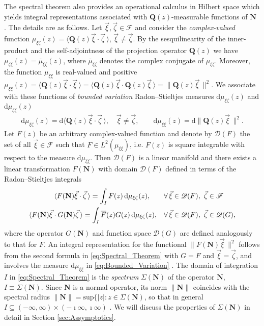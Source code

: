 \documentclass[11pt]{amsart}
\renewcommand{\d}{\mathrm{d}}
\newcommand{\Qb}{\mathbf{Q}}
\newcommand{\Nb}{\mathbf{N}}
\newcommand{\Fs}{\mathscr{F}}
\begin{document}
The spectral theorem also provides an operational calculus in Hilbert
space which yields integral representations associated with
$\Qb(z)$-measurable functions of $\Nb$ \cite{Stone:64}. The details
are as follows. Let $\vec{\xi},\vec{\zeta}\in\Fs$ and consider the
\emph{complex-valued} function $\mu_{\xi\zeta}(z)=\langle\Qb(z)\vec{\xi}\cdot\vec{\zeta}\,\rangle$,
$\vec{\xi}\neq\vec{\zeta}$. By the sesquilinearity of the inner-product and the
self-adjointness of the projection operator $\Qb(z)$ we have
$\mu_{\zeta\xi}(z)=\overline{\mu}_{\xi\zeta}(z)$, where $\overline{\mu}_{\xi\zeta}$ denotes
the complex conjugate of $\mu_{\xi\zeta}$. Moreover, the function $\mu_{\xi\xi}$ is
real-valued and positive
$\mu_{\xi\xi}(z)=\langle\Qb(z)\vec{\xi}\cdot\vec{\xi}\,\rangle=\langle\Qb(z)\vec{\xi}\cdot\Qb(z)\vec{\xi}\,\rangle
=\|\Qb(z)\vec{\xi}\,\|^2$. We associate with these functions of
\emph{bounded variation} Radon--Stieltjes measures $\d\mu_{\xi\zeta}(z)$ and
$\d\mu_{\xi\xi}(z)$ \cite{Stone:64}   
%
\begin{align}\label{eq:Bounded_Variation}
  \d\mu_{\xi\zeta}(z)=\d\langle\Qb(z)\vec{\xi}\cdot\vec{\zeta}\,\rangle, \quad
  \vec{\xi}\neq\vec{\zeta}, \qquad
  \d\mu_{\xi\xi}(z)=\d\|\Qb(z)\vec{\xi}\,\|^2.
\end{align}
%
Let $F(z)$ be an arbitrary complex-valued function and denote by
$\mathscr{D}(F)$ the set of all $\vec{\xi}\in\Fs$ such that
$F\in L^2(\mu_{\xi\xi})$, i.e. $F(z)$ is square integrable with respect to the
measure $\d\mu_{\xi\xi}$. 
Then $\mathscr{D}(F)$ is a linear manifold and there exists a linear
transformation $F(\Nb)$ with domain $\mathscr{D}(F)$ defined in terms
of the Radon--Stieltjes integrals \cite{Stone:64} 
%
\begin{align}\label{eq:Spectral_Theorem}
  \langle F(\Nb)\vec{\xi}\cdot\vec{\zeta}\,\rangle=\int_IF(z)\,\d\mu_{\xi\zeta}(z), \qquad
  &\forall \, \vec{\xi}\in\mathscr{D}(F), \ \vec{\zeta}\in\Fs
  \\
  \langle F(\Nb)\vec{\xi}\cdot G(\Nb)\vec{\zeta}\,\rangle=\int_I\overline{F}(z)G(z)\,\d\mu_{\xi\zeta}(z),
  \quad
  &\forall \, \vec{\xi}\in\mathscr{D}(F), \ \vec{\zeta}\in\mathscr{D}(G),
  \notag
\end{align}
%
where the operator $G(\Nb)$ and function space $\mathscr{D}(G)$ are
defined analogously to that for $F$. An integral representation for
the functional $\|F(\Nb)\vec{\xi}\,\|^2$ follows from the second formula
in \eqref{eq:Spectral_Theorem} with $G=F$ and $\vec{\xi}=\vec{\zeta}$, and
involves the measure $\d\mu_{\xi\xi}$ in \eqref{eq:Bounded_Variation}
\cite{Stone:64}.  The domain of integration $I$ in
\eqref{eq:Spectral_Theorem} is the \emph{spectrum} $\Sigma(\Nb)$ of the
operator $\Nb$, $I\equiv\Sigma(\Nb)$. Since $\Nb$ is a normal operator, its norm 
$\|\Nb\|$ coincides with the spectral radius
$\|\Nb\|=\text{sup}\{|z|: z\in\Sigma(\Nb)$, so that in general
$I\subseteq(-\infty,\infty)\times(-\imath\infty,\imath\infty)$  \cite{Reed-1980,Stone:64}.  We will discuss the
properties of $\Sigma(\Nb)$ in detail in Section \ref{sec:Assymptotics}.  
\end{document}
